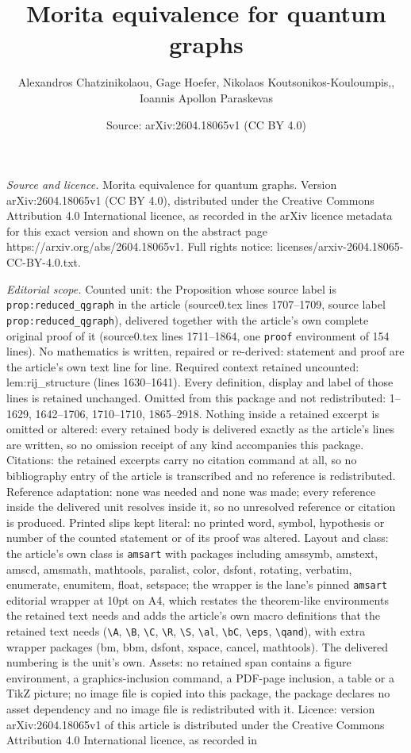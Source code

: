 \documentclass[10pt,a4paper]{amsart}
\title[Morita equivalence for quantum graphs]{Morita equivalence for quantum graphs}
\author{Alexandros Chatzinikolaou, Gage Hoefer, Nikolaos Koutsonikos-Kouloumpis,, Ioannis Apollon Paraskevas}
\date{Source: arXiv:2604.18065v1 (CC BY 4.0)}
\begin{document}
\maketitle

\noindent\emph{Source and licence.} Morita equivalence for quantum graphs. Version arXiv:2604.18065v1 (CC BY 4.0), distributed under the Creative Commons Attribution 4.0 International licence, as recorded in the arXiv licence metadata for this exact version and shown on the abstract page https://arxiv.org/abs/2604.18065v1. Full rights notice: licenses/arxiv-2604.18065-CC-BY-4.0.txt.\par\smallskip

\noindent\textit{Editorial scope.} Counted unit: the Proposition whose source label is \texttt{prop:reduced\_qgraph} in the article (source0.tex lines 1707--1709, source label \texttt{prop:reduced\_qgraph}), delivered together with the article's own complete original proof of it (source0.tex lines 1711--1864, one \texttt{proof} environment of 154 lines). No mathematics is written, repaired or re-derived: statement and proof are the article's own text line for line. Required context retained uncounted: lem:rij\_structure (lines 1630--1641). Every definition, display and label of those lines is retained unchanged. Omitted from this package and not redistributed: 1--1629, 1642--1706, 1710--1710, 1865--2918. Nothing inside a retained excerpt is omitted or altered: every retained body is delivered exactly as the article's lines are written, so no omission receipt of any kind accompanies this package. Citations: the retained excerpts carry no citation command at all, so no bibliography entry of the article is transcribed and no reference is redistributed. Reference adaptation: none was needed and none was made; every reference inside the delivered unit resolves inside it, so no unresolved reference or citation is produced. Printed slips kept literal: no printed word, symbol, hypothesis or number of the counted statement or of its proof was altered. Layout and class: the article's own class is \texttt{amsart} with packages including amssymb, amstext, amscd, amsmath, mathtools, paralist, color, dsfont, rotating, verbatim, enumerate, enumitem, float, setspace; the wrapper is the lane's pinned \texttt{amsart} editorial wrapper at 10pt on A4, which restates the theorem-like environments the retained text needs and adds the article's own macro definitions that the retained text needs (\texttt{\textbackslash A}, \texttt{\textbackslash B}, \texttt{\textbackslash C}, \texttt{\textbackslash R}, \texttt{\textbackslash S}, \texttt{\textbackslash al}, \texttt{\textbackslash bC}, \texttt{\textbackslash eps}, \texttt{\textbackslash qand}), with extra wrapper packages (bm, bbm, dsfont, xspace, cancel, mathtools). The delivered numbering is the unit's own. Assets: no retained span contains a figure environment, a graphics-inclusion command, a PDF-page inclusion, a table or a TikZ picture; no image file is copied into this package, the package declares no asset dependency and no image file is redistributed with it. Licence: version arXiv:2604.18065v1 of this article is distributed under the Creative Commons Attribution 4.0 International licence, as recorded in 
\end{document}
